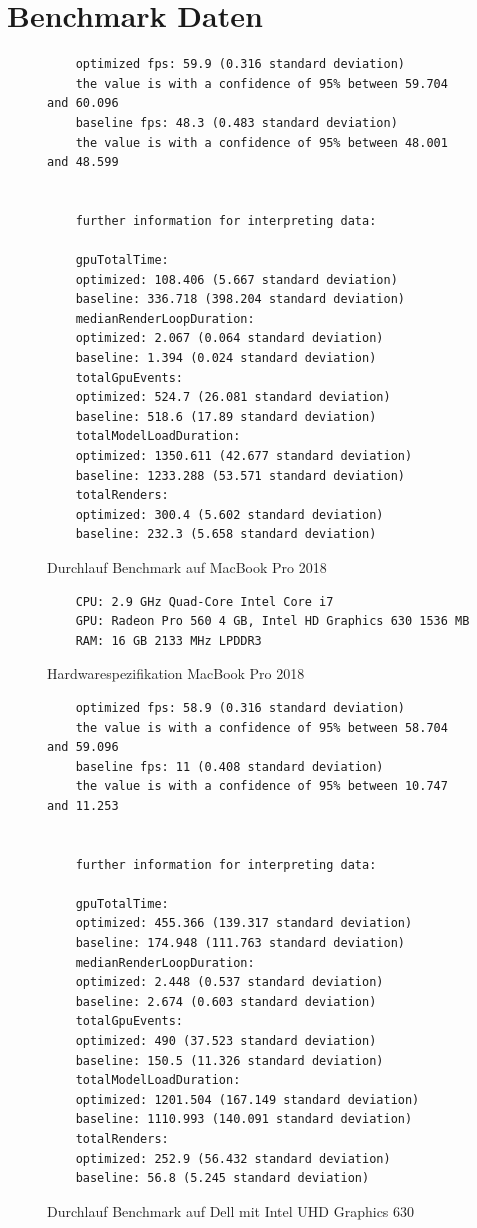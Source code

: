 \section{Benchmark Daten}
\begin{figure}[H]
  \begin{lstlisting}
    optimized fps: 59.9 (0.316 standard deviation)
    the value is with a confidence of 95% between 59.704 and 60.096
    baseline fps: 48.3 (0.483 standard deviation)
    the value is with a confidence of 95% between 48.001 and 48.599


    further information for interpreting data:

    gpuTotalTime:
    optimized: 108.406 (5.667 standard deviation)
    baseline: 336.718 (398.204 standard deviation)
    medianRenderLoopDuration:
    optimized: 2.067 (0.064 standard deviation)
    baseline: 1.394 (0.024 standard deviation)
    totalGpuEvents:
    optimized: 524.7 (26.081 standard deviation)
    baseline: 518.6 (17.89 standard deviation)
    totalModelLoadDuration:
    optimized: 1350.611 (42.677 standard deviation)
    baseline: 1233.288 (53.571 standard deviation)
    totalRenders:
    optimized: 300.4 (5.602 standard deviation)
    baseline: 232.3 (5.658 standard deviation)
  \end{lstlisting}
\caption{Durchlauf Benchmark auf MacBook Pro 2018}
\label{fig:benchmarkRun}
\end{figure}

\begin{figure}[H]
  \begin{lstlisting}
    CPU: 2.9 GHz Quad-Core Intel Core i7
    GPU: Radeon Pro 560 4 GB, Intel HD Graphics 630 1536 MB
    RAM: 16 GB 2133 MHz LPDDR3
  \end{lstlisting}
\caption{Hardwarespezifikation MacBook Pro 2018}
\label{fig:MarcbookProSpecification}
\end{figure}

\begin{figure}[H]
  \begin{lstlisting}
    optimized fps: 58.9 (0.316 standard deviation)
    the value is with a confidence of 95% between 58.704 and 59.096
    baseline fps: 11 (0.408 standard deviation)
    the value is with a confidence of 95% between 10.747 and 11.253


    further information for interpreting data:

    gpuTotalTime:
    optimized: 455.366 (139.317 standard deviation)
    baseline: 174.948 (111.763 standard deviation)
    medianRenderLoopDuration:
    optimized: 2.448 (0.537 standard deviation)
    baseline: 2.674 (0.603 standard deviation)
    totalGpuEvents:
    optimized: 490 (37.523 standard deviation)
    baseline: 150.5 (11.326 standard deviation)
    totalModelLoadDuration:
    optimized: 1201.504 (167.149 standard deviation)
    baseline: 1110.993 (140.091 standard deviation)
    totalRenders:
    optimized: 252.9 (56.432 standard deviation)
    baseline: 56.8 (5.245 standard deviation)
  \end{lstlisting}
\caption{Durchlauf Benchmark auf Dell mit Intel UHD Graphics 630}
\label{fig:windowsBenchmarkRun}
\end{figure}

